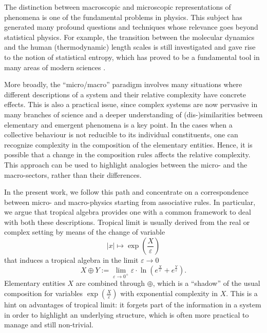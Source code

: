 \documentclass[11pt,british,reqno]{article}
\numberwithin{equation}{section}
\numberwithin{figure}{section}
\numberwithin{table}{section}
\theoremstyle{definition}
\theoremstyle{definition}
\theoremstyle{plain}
\theoremstyle{plain}
\theoremstyle{remark}
\theoremstyle{plain}
\numberwithin{equation}{section}
\numberwithin{figure}{section}
\numberwithin{table}{section}
\theoremstyle{plain}
\begin{document}
The distinction between macroscopic and microscopic representations of phenomena is one of the fundamental problems in physics. This subject has generated many profound questions and techniques whose relevance goes beyond statistical physics. For example, the transition between the molecular dynamics and the human (thermodynamic) length scales is still investigated \cite{Bartlett1980,Posch1997,Crooks1999} and gave rise to the notion of statistical entropy, which has proved to be a fundamental tool in many areas of modern sciences \cite{Gray2011,Holzinger2014,Kahraman2016}. 

More broadly, the ``micro/macro'' paradigm involves many situations where different descriptions of a system and their relative complexity have concrete effects. This is also a practical issue, since complex systems are now pervasive in many branches of science \cite{Nicolis2012} and a deeper understanding of (dis-)similarities between elementary and emergent phenomena is a key point. In the cases when a collective behaviour is not reducible to its individual constituents, one can recognize complexity in the composition of the elementary entities. Hence, it is possible that a change in the composition rules affects the relative complexity. This approach can be used to highlight analogies between the micro- and the macro-sectors, rather than their differences. 

In the present work, we follow this path and concentrate on a correspondence between micro- and macro-physics starting from associative rules. In particular, we argue that tropical algebra \cite{MS2015} provides one with a common framework to deal with both these descriptions. Tropical limit is usually derived from the real or complex setting by means of the change of variable
\begin{equation}
|x|\mapsto\exp\left(\frac{X}{\varepsilon}\right)\label{eq: tropical change variable}
\end{equation}
that induces a tropical algebra in the limit $\varepsilon\rightarrow0$
\begin{equation}
X\oplus Y:=\lim_{\varepsilon\rightarrow0^{+}}\varepsilon\cdot\ln\left(e^{\frac{X}{\varepsilon}}+e^{\frac{Y}{\varepsilon}}\right).\label{eq: standard tropical limit sum}
\end{equation}
Elementary entities $X$ are combined through $\oplus$, which is a ``shadow'' of the usual composition for variables ${\displaystyle \exp\left(\frac{X}{\varepsilon}\right)}$ with exponential complexity in $X$. This is a hint on advantages of tropical limit: it forgets part of the information in a system in order to highlight an underlying structure, which is often more practical to manage and still non-trivial. 
\end{document}
